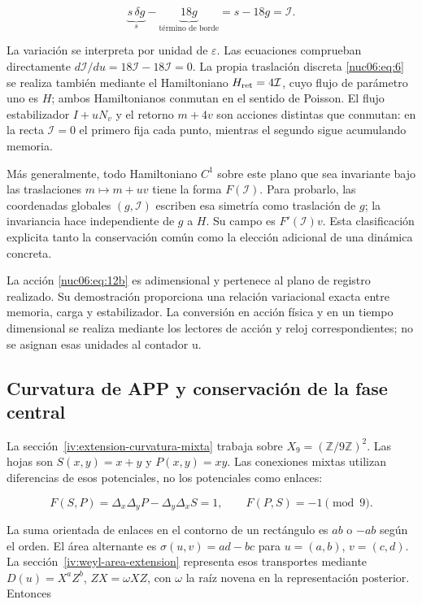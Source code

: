 \begin{equation}
\underbrace{s\,\delta g}_{s}
-\underbrace{18g}_{\text{término de borde}}
=s-18g=\mathcal I.
\label{nuc06:eq:12c}
\end{equation}

La variación se interpreta por unidad de \(\varepsilon\). Las ecuaciones comprueban directamente \(d\mathcal I/du=18\mathcal I-18\mathcal I=0\). La propia traslación discreta \eqref{nuc06:eq:6} se realiza también mediante el Hamiltoniano \(H_{\rm ret}=4\mathcal I\), cuyo flujo de parámetro uno es \(H\); ambos Hamiltonianos conmutan en el sentido de Poisson. El flujo estabilizador \(I+uN_v\) y el retorno \(m+4v\) son acciones distintas que conmutan: en la recta \(\mathcal I=0\) el primero fija cada punto, mientras el segundo sigue acumulando memoria.

Más generalmente, todo Hamiltoniano \(C^1\) sobre este plano que sea invariante bajo las traslaciones \(m\mapsto m+uv\) tiene la forma \(F(\mathcal I)\). Para probarlo, las coordenadas globales \((g,\mathcal I)\) escriben esa simetría como traslación de \(g\); la invariancia hace independiente de \(g\) a \(H\). Su campo es \(F'(\mathcal I)v\). Esta clasificación explicita tanto la conservación común como la elección adicional de una dinámica concreta.

La acción \eqref{nuc06:eq:12b} es adimensional y pertenece al plano de registro realizado. Su demostración proporciona una relación variacional exacta entre memoria, carga y estabilizador. La conversión en acción física y en un tiempo dimensional se realiza mediante los lectores de acción y reloj correspondientes; no se asignan esas unidades al contador u.

\subsection{Curvatura de APP y conservación de la fase central}

La sección~\ref{iv:extension-curvatura-mixta} trabaja sobre \(X_9=(\mathbb Z/9\mathbb Z)^2\). Las hojas son \(S(x,y)=x+y\) y \(P(x,y)=xy\). Las conexiones mixtas utilizan diferencias de esos potenciales, no los potenciales como enlaces:

\begin{equation}
F(S,P)=\Delta_x\Delta_yP-\Delta_y\Delta_xS=1,
\qquad F(P,S)=-1\pmod9.
\label{nuc06:eq:13}
\end{equation}

La suma orientada de enlaces en el contorno de un rectángulo es \(ab\) o \(-ab\) según el orden. El área alternante es \(\sigma(u,v)=ad-bc\) para \(u=(a,b)\), \(v=(c,d)\). La sección~\ref{iv:weyl-area-extension} representa esos transportes mediante \(D(u)=X^aZ^b\), \(ZX=\omega XZ\), con \(\omega\) la raíz novena en la representación posterior. Entonces

